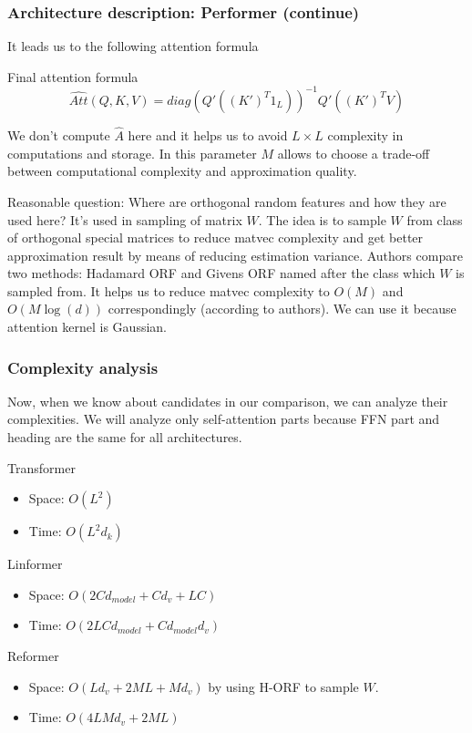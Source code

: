 \documentclass[9pt]{beamer}%
\begin{document}
\begin{frame}
	\frametitle{Architecture description: Performer (continue)}
	
	It leads us to the following attention formula
	
	\begin{block}{Final attention formula}
		\[ \hat{Att}(Q, K, V) = diag(Q'((K')^T 1_L))^{-1} Q'((K')^T V) \]
	\end{block}
	
	We don't compute $\hat{A}$ here and it helps us to avoid $L \times L$ complexity in computations and storage. In this parameter $M$ allows to choose a trade-off between computational complexity and approximation quality. 
	
	\begin{block}{Reasonable question: Where are orthogonal random features and how they are used here?}
		It's used in sampling of matrix $W$. The idea is to sample $W$ from class of orthogonal special matrices to reduce matvec complexity and get better approximation result by means of reducing estimation variance. Authors compare two methods: Hadamard ORF and Givens ORF named after the class which $W$ is sampled from. It helps us to reduce matvec complexity to $O(M)$ and $O(M \log (d))$ correspondingly (according to authors). We can use it because attention kernel is Gaussian.
	\end{block} 
	
\end{frame}

\begin{frame}
	\frametitle{Complexity analysis}
	
	Now, when we know about candidates in our comparison, we can analyze their complexities. We will analyze only self-attention parts because FFN part and heading are the same for all architectures. 
	
	\begin{block}{Transformer}
		\begin{itemize}
			\item Space: $O(L^2)$
			\item Time: $O(L^2d_{k})$
		\end{itemize}
	\end{block}

	\begin{block}{Linformer}
		\begin{itemize}
			\item Space: $O(2Cd_{model} + Cd_v + LC)$
			\item Time: $O(2LCd_{model} + Cd_{model}d_v)$
		\end{itemize}
	\end{block}

	\begin{block}{Reformer}
		\begin{itemize}
			\item Space: $O(Ld_v + 2ML + Md_v)$ by using H-ORF to sample $W$.
			\item Time: $O(4LMd_{v} + 2ML)$
		\end{itemize}
	\end{block}
	
\end{frame}
\end{document}
